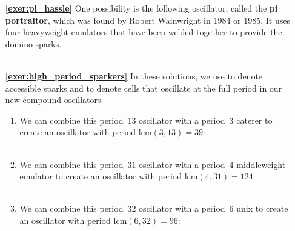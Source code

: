 \begin{multicols}{2}
\begin{itemize}[leftmargin=0em]
		
		\item[\bf\color{ocre}\sffamily\ref{exer:pi_hassle}] One possibility is the following oscillator, called the \textbf{pi portraitor}, which was found by Robert Wainwright in 1984 or 1985. It uses four heavyweight emulators that have been welded together to provide the domino sparks. \\[-0.6em]
		
		 \\
		
		
		\item[\bf\color{ocre}\sffamily\ref{exer:high_period_sparkers}] In these solutions, we use  to denote accessible sparks and  to denote cells that oscillate at the full period in our new compound oscillators.
		\begin{enumerate}[leftmargin=1.5em,label=\bf\color{ocre}(\alph*)]
			\item We can combine this period~$13$ oscillator with a period~$3$ caterer to create an oscillator with period $\mathrm{lcm}(3,13) = 39$: \\[-0.6em]
			
			 \\
			
			\item We can combine this period~$31$ oscillator with a period~$4$ middleweight emulator to create an oscillator with period $\mathrm{lcm}(4,31) = 124$:  \\[-0.6em]
			
			 \\
			
			\item We can combine this period~$32$ oscillator with a period~$6$ unix to create an oscillator with period $\mathrm{lcm}(6,32) = 96$: \\[-0.6em]
			
			\\
		\end{enumerate}
	


\end{itemize}
\end{multicols}
